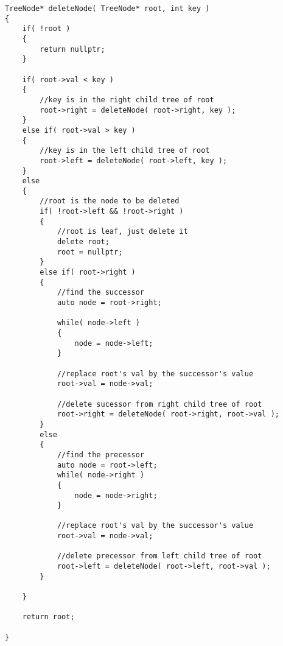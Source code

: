 \setcounter{lstlisting}{0}
\begin{lstlisting}[style=customc, caption={Recursion}]
TreeNode* deleteNode( TreeNode* root, int key )
{
    if( !root )
    {
        return nullptr;
    }

    if( root->val < key )
    {
        //key is in the right child tree of root
        root->right = deleteNode( root->right, key );
    }
    else if( root->val > key )
    {
        //key is in the left child tree of root
        root->left = deleteNode( root->left, key );
    }
    else
    {
        //root is the node to be deleted
        if( !root->left && !root->right )
        {
            //root is leaf, just delete it
            delete root;
            root = nullptr;
        }
        else if( root->right )
        {
            //find the successor
            auto node = root->right;

            while( node->left )
            {
                node = node->left;
            }

            //replace root's val by the successor's value
            root->val = node->val;

            //delete sucessor from right child tree of root
            root->right = deleteNode( root->right, root->val );
        }
        else
        {
            //find the precessor
            auto node = root->left;
            while( node->right )
            {
                node = node->right;
            }

            //replace root's val by the successor's value
            root->val = node->val;

            //delete precessor from left child tree of root
            root->left = deleteNode( root->left, root->val );
        }

    }

    return root;

}
\end{lstlisting}